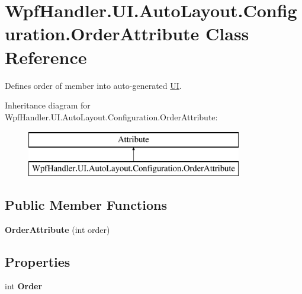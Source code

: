 \hypertarget{class_wpf_handler_1_1_u_i_1_1_auto_layout_1_1_configuration_1_1_order_attribute}{}\section{Wpf\+Handler.\+U\+I.\+Auto\+Layout.\+Configuration.\+Order\+Attribute Class Reference}
\label{class_wpf_handler_1_1_u_i_1_1_auto_layout_1_1_configuration_1_1_order_attribute}


Defines order of member into auto-\/generated \mbox{\hyperlink{namespace_wpf_handler_1_1_u_i}{UI}}.  


Inheritance diagram for Wpf\+Handler.\+U\+I.\+Auto\+Layout.\+Configuration.\+Order\+Attribute\+:\begin{figure}[H]
\begin{center}
\leavevmode
\includegraphics[height=2.000000cm]{df/d2b/class_wpf_handler_1_1_u_i_1_1_auto_layout_1_1_configuration_1_1_order_attribute}
\end{center}
\end{figure}
\subsection*{Public Member Functions}
\begin{DoxyCompactItemize}
\item 
\mbox{\label{class_wpf_handler_1_1_u_i_1_1_auto_layout_1_1_configuration_1_1_order_attribute_a1cd880e2369a3a6be08d0ace9be115ab}} 
{\bfseries Order\+Attribute} (int order)
\end{DoxyCompactItemize}
\subsection*{Properties}
\begin{DoxyCompactItemize}
\item 
\mbox{\label{class_wpf_handler_1_1_u_i_1_1_auto_layout_1_1_configuration_1_1_order_attribute_af216fd2b8c66cf70d39b0904793c345a}} 
int {\bfseries Order}
\end{DoxyCompactItemize}
